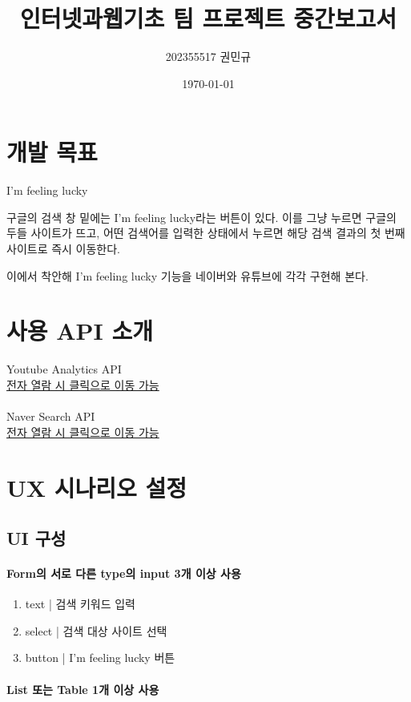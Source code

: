 \documentclass[a4paper, titlepage]{article}
\title{인터넷과웹기초 팀 프로젝트 중간보고서}
\author{202355517 권민규}
\date{\today}
\begin{document}
\maketitle

\section{개발 목표}
I'm feeling lucky

구글의 검색 창 밑에는 I'm feeling lucky라는 버튼이 있다. 이를 그냥 누르면 구글의 두들 사이트가 뜨고, 어떤 검색어를 입력한 상태에서 누르면 해당 검색 결과의 첫 번째 사이트로 즉시 이동한다.

이에서 착안해 I'm feeling lucky 기능을 네이버와 유튜브에 각각 구현해 본다.


\section{사용 API 소개}
Youtube Analytics API\\
\href{https://console.cloud.google.com/apis/library/youtubeanalytics.googleapis.com?project=oceanic-diagram-387216&supportedpurview=project}{전자 열람 시 클릭으로 이동 가능}\\\\
Naver Search API\\
\href{https://developers.naver.com/apps/#/cooperation}{전자 열람 시 클릭으로 이동 가능}


\section{UX 시나리오 설정}

\subsection{UI 구성}

\paragraph{Form의 서로 다른 type의 input 3개 이상 사용}
\begin{enumerate}
    \item{text | }검색 키워드 입력
    \item{select | }검색 대상 사이트 선택
    \item{button | }I'm feeling lucky 버튼
\end{enumerate}

\paragraph{List 또는 Table 1개 이상 사용}
\end{document}
